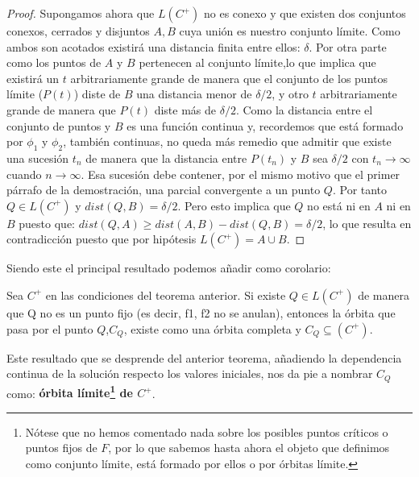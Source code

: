 \begin{theorem}[]
\begin{proof}
 		Supongamos ahora que $L(C^+)$ no es conexo y que existen dos conjuntos conexos, cerrados y disjuntos $A , B$ cuya unión es nuestro conjunto límite. Como ambos son acotados existirá una distancia finita entre ellos: $\delta$. Por otra parte como los puntos de $A$ y $B$ pertenecen al conjunto límite,lo que implica que existirá un $t$ arbitrariamente grande de manera que el conjunto de los puntos límite ($P(t)$) diste de $B$ una distancia menor de $\delta /2$, y otro $t$ arbitrariamente grande de manera que $P(t)$ diste más de $\delta /2$. Como la distancia entre el conjunto de puntos y $B$ es una función continua y, recordemos que está formado por $\phi_1$ y $\phi_2$, también continuas, no queda más remedio que admitir que existe una sucesión ${t_n}$ de manera que la distancia entre $P(t_n)$ y $B$ sea $\delta/2$ con $t_n\rightarrow \infty$ cuando $n\rightarrow \infty$. Esa sucesión debe contener, por el mismo motivo que el primer párrafo de la demostración, una parcial convergente a un punto $Q$. Por tanto $Q \in L(C^+)$ y $dist(Q,B)=\delta/2$. Pero esto implica que $Q$ no está ni en $A$ ni en $B$ puesto que: $dist(Q,A)\geq dist(A,B)-dist(Q,B)=\delta/2$, lo que resulta en contradicción puesto que por hipótesis $L(C^+)=A\cup B$.
 	\end{proof}
 \end{theorem}
 Siendo este el principal resultado podemos añadir como corolario:
 \begin{corollary}
 	Sea $C^+$ en las condiciones del teorema anterior. Si existe $Q\in L(C^+)$ de manera que Q no es un punto fijo (es decir, f1, f2 no se anulan), entonces la órbita que pasa por el punto $Q$,$C_Q$, existe como una órbita completa y $C_Q\subseteq (C^+)$.
 \end{corollary}
 Este resultado que se desprende del anterior teorema, añadiendo la dependencia continua de la solución respecto  los valores iniciales, nos da pie a nombrar $C_Q$ como: \textbf{órbita límite\footnote{Nótese que no hemos comentado nada sobre los posibles puntos críticos o puntos fijos de $F$, por lo que sabemos hasta ahora el objeto que definimos como conjunto límite, está formado por ellos o por órbitas límite.} de $C^+$}.
 
